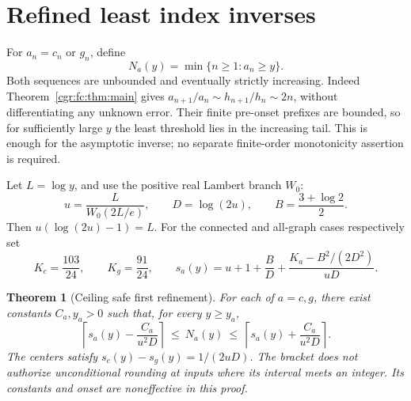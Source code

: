 \documentclass[11pt,letterpaper]{article}
\numberwithin{equation}{section}
\newtheorem{theorem}{Theorem}[section]
\theoremstyle{definition}\newtheorem{definition}[theorem]{Definition}
\theoremstyle{remark}\newtheorem{remark}[theorem]{Remark}
\newcommand{\ceil}[1]{\left\lceil #1\right\rceil}
\begin{document}
\section{Refined least index inverses}\label{cgr:fc:sec:inverse}
For $a_n=c_n$ or $g_n$, define
\[
 N_a(y)=\min\{n\ge1:a_n\ge y\}.
\]
Both sequences are unbounded and eventually strictly increasing.
Indeed Theorem~\ref{cgr:fc:thm:main} gives
$a_{n+1}/a_n\sim h_{n+1}/h_n\sim2n$, without differentiating any
unknown error. Their finite pre-onset prefixes are bounded, so for
sufficiently large $y$ the least threshold lies in the increasing
tail. This is enough for the asymptotic inverse; no separate
finite-order monotonicity assertion is required.

Let $L=\log y$, and use the positive real Lambert branch $W_0$:
\begin{equation}\label{cgr:fc:eq:inverse-vars}
 u=\frac{L}{W_0(2L/e)},\qquad D=\log(2u),\qquad
 B=\frac{3+\log2}{2}.
\end{equation}
Then $u(\log(2u)-1)=L$. For the connected and all-graph cases
respectively set
\[
 K_c=\frac{103}{24},\qquad K_g=\frac{91}{24},\qquad
 s_a(y)=u+1+\frac BD+
       \frac{K_a-B^2/(2D^2)}{uD}.
\]

\begin{theorem}[Ceiling safe first refinement]\label{cgr:fc:thm:inverse}
For each of $a=c,g$, there exist constants $C_a,y_a>0$ such that,
for every $y\ge y_a$,
\begin{equation}\label{cgr:fc:eq:inverse-bracket}
 \ceil{s_a(y)-\frac{C_a}{u^2D}}
 \ \le\ N_a(y)\ \le\
 \ceil{s_a(y)+\frac{C_a}{u^2D}}.
\end{equation}
The centers satisfy $s_c(y)-s_g(y)=1/(2uD)$.
The bracket does not authorize unconditional rounding at inputs
where its interval meets an integer. Its constants and onset are
noneffective in this proof.
\end{theorem}
\end{document}
